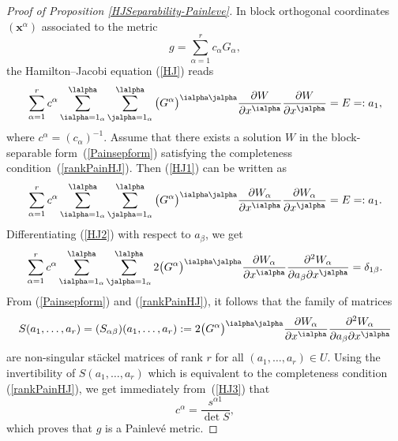 \begin{proof}[Proof of Proposition \ref{HJSeparability-Painleve}]

In block orthogonal coordinates $(\textbf{x}^\alpha)$ associated to the metric
\[
 g = \sum_{\alpha = 1}^r c_\alpha G_\alpha,
\]
the Hamilton--Jacobi equation (\ref{HJ}) reads
\begin{gather} \label{HJ1}
 \sum_{\alpha =1}^{r} c^\alpha \sum_{\ialpha =1_{\alpha}}^{\lalpha}\sum_{\jalpha =1_{\alpha}}^{\lalpha} \big(G^{\alpha}\big)^{\ialpha \jalpha}\frac{\partial W}{\partial x^{\ialpha} }\frac{\partial W}{\partial x^{\jalpha}}=E=:a_{1},
\end{gather}
where $c^\alpha = (c_\alpha)^{-1}$. Assume that there exists a solution $W$ in the block-separable form~(\ref{Painsepform}) satisfying the completeness condition~(\ref{rankPainHJ}). Then (\ref{HJ1}) can be written as
\begin{gather} \label{HJ2}
 \sum_{\alpha =1}^{r} c^\alpha \sum_{\ialpha =1_{\alpha}}^{\lalpha}\sum_{\jalpha =1_{\alpha}}^{\lalpha} \big(G^{\alpha}\big)^{\ialpha \jalpha}\frac{\partial W_\alpha}{\partial x^{\ialpha} }\frac{\partial W_\alpha}{\partial x^{\jalpha}}=E=:a_{1}.
\end{gather}
Differentiating (\ref{HJ2}) with respect to $a_\beta$, we get
\begin{gather} \label{HJ3}
 \sum_{\alpha =1}^{r} c^\alpha \sum_{\ialpha =1_{\alpha}}^{\lalpha}\sum_{\jalpha =1_{\alpha}}^{\lalpha} 2 \big(G^{\alpha}\big)^{\ialpha \jalpha}\frac{\partial W_\alpha}{\partial x^{\ialpha} } \frac{\partial^2 W_\alpha}{\partial a_\beta \partial x^{\jalpha}} = \delta_{1\beta} .
\end{gather}
From (\ref{Painsepform}) and (\ref{rankPainHJ}), it follows that the family of matrices
\begin{gather*} %
 S(a_1,\dots,a_r) = (S_{\alpha \beta})(a_1,\dots,a_r) := 2 \big(G^{\alpha}\big)^{\ialpha \jalpha}\frac{\partial W_\alpha}{\partial x^{\ialpha} } \frac{\partial^2 W_\alpha}{\partial a_\beta \partial x^{\jalpha}}
\end{gather*}
are non-singular st\"ackel matrices of rank $r$ for all $(a_1,\dots,a_r) \in U$. Using the invertibility of $S(a_1,\dots,a_r)$ which is equivalent to the completeness condition (\ref{rankPainHJ}), we get immediately from~(\ref{HJ3}) that
\[
 c^\alpha = \frac{s^{\alpha 1}}{\det S},
\]
which proves that $g$ is a Painlev\'e metric.


\end{proof}
